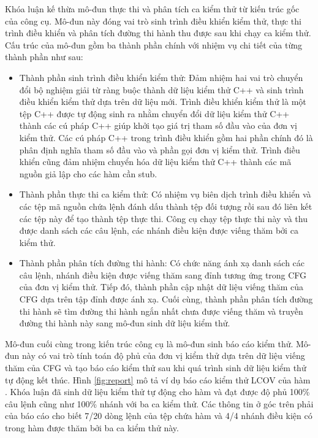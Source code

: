 Khóa luận kế thừa mô-đun thực thi và phân tích ca kiểm thử từ kiến trúc gốc của công cụ. Mô-đun này đóng vai trò  sinh trình điều khiển kiểm thử, thực thi trình điều khiển và phân tích đường thi hành thu được sau khi chạy ca kiểm thử. Cấu trúc của mô-đun gồm ba thành phần chính với nhiệm vụ chi tiết của từng thành phần như sau:
\begin{itemize}
    \item Thành phần sinh trình điều khiển kiểm thử: Đảm nhiệm hai vai trò chuyển đổi bộ nghiệm giải từ ràng buộc thành dữ liệu kiểm thử C++ và sinh trình điều khiển kiểm thử dựa trên dữ liệu mới. Trình điều khiển kiểm thử là một tệp C++ được tự động sinh ra nhằm chuyển đổi dữ liệu kiểm thử C++ thành các cú pháp C++ giúp khởi tạo giá trị tham số đầu vào của đơn vị kiểm thử. Các cú pháp C++ trong trình điều khiển gồm hai phần chính đó là phân định nghĩa tham số đầu vào và phần gọi đơn vị kiểm thử. Trình điều khiển cũng đảm nhiệm chuyển hóa dữ liệu kiểm thử C++ thành các mã nguồn giả lập cho các hàm cần stub.
    \item Thành phần thực thi ca kiểm thử: Có nhiệm vụ biên dịch trình điều khiển và các tệp mã nguồn chứa lệnh đánh dấu thành tệp đối tượng rồi sau đó liên kết các tệp này để tạo thành tệp thực thi. Công cụ chạy tệp thực thi này và thu được danh sách các câu lệnh, các nhánh điều kiện được viếng thăm bởi ca kiểm thử.
    \item Thành phần phân tích đường thi hành: Có chức năng ánh xạ danh sách các câu lệnh, nhánh điều kiện được viếng thăm sang đỉnh tương ứng trong CFG của đơn vị kiểm thử. Tiếp đó, thành phần cập nhật dữ liệu viếng thăm của CFG dựa trên tập đỉnh được ánh xạ. Cuối cùng, thành phần phân tích đường thi hành sẽ tìm đường thi hành ngắn nhất chưa được viếng thăm và truyền đường thi hành này sang mô-đun sinh dữ liệu kiểm thử.
\end{itemize}

Mô-đun cuối cùng trong kiến trúc công cụ là mô-đun sinh báo cáo kiểm thử. Mô-đun này có vai trò tính toán độ phủ của đơn vị kiểm thử dựa trên dữ liệu viếng thăm của CFG và tạo báo cáo kiểm thử sau khi quá trình sinh dữ liệu kiểm thử tự động kết thúc. Hình \ref{fig:report} mô tả ví dụ báo cáo kiểm thử LCOV của hàm . Khóa luận đã sinh dữ liệu kiểm thử tự động cho hàm  và đạt được độ phủ 100\% câu lệnh cũng như 100\% nhánh với ba ca kiểm thử. Các thông tin ở góc trên phải của báo cáo cho biết 7/20 dòng lệnh của tệp chứa hàm  và 4/4 nhánh điều kiện có trong hàm được thăm bởi ba ca kiểm thử này. 

